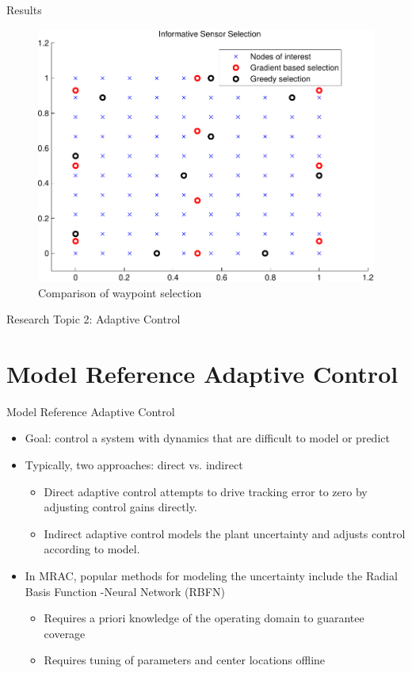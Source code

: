 \documentclass[11pt,mathserif]{beamer}
\begin{document}
\begin{frame}[t]{Results}
\begin{figure}
\centering
\includegraphics[width=0.7\columnwidth]{figures/SensorLoc.pdf} \caption{Comparison of waypoint selection}
\end{figure}
\end{frame}


\begin{frame}
\huge{Research Topic 2: Adaptive Control}
\end{frame}
\section[GP-MRAC]{Model Reference Adaptive Control}
\begin{frame}[t]{Model Reference Adaptive Control}
\begin{itemize}
\item Goal: control a system with dynamics that are difficult to model or predict
\item Typically, two approaches: direct vs. indirect
  \begin{itemize}
  \item Direct adaptive control attempts to drive tracking error to zero
    by adjusting control gains directly.
  \item Indirect adaptive control models the plant uncertainty and
    adjusts control according to model.
  \end{itemize}
\item In MRAC, popular methods for modeling the uncertainty include
  the Radial Basis Function -Neural Network (RBFN)
  \begin{itemize}
  \item Requires a priori knowledge of the operating domain to
    guarantee coverage
  \item Requires tuning of parameters and center locations offline
  \end{itemize}
\end{itemize}
\end{frame}
\end{document}

